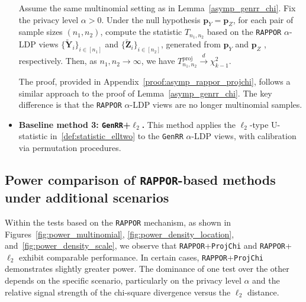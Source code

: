 \documentclass[twoside,11pt]{article}
\newcommand{\alphabetSize}{k} %
\newcommand{\sampleSize}{n}
\newcommand{\privacyParameter}{\alpha} %
\begin{document}
\begin{appendix}
\begin{itemize}
	\begin{lemma} \label{asymp_rappor_projchi} 
		Assume the same multinomial setting as in Lemma~\ref{asymp_genrr_chi}.
		Fix the privacy level $\privacyParameter>0$.
		Under the null hypothesis $\mathbf{p}_Y = \mathbf{p}_Z$, for each pair of sample sizes $(n_1, n_2)$, compute the statistic $T_{n_1, n_2}$ based on the  \textnormal{\texttt{RAPPOR}} $\privacyParameter$-LDP views $\{\tilde{\mathbf{Y}}_i\}_{i \in [n_1]}$ and $\{\tilde{\mathbf{Z}}_i\}_{i \in [n_2]}$, generated from $\mathbf{p}_Y$ and $\mathbf{p}_Z$ , respectively. Then, as $n_1, n_2 \to \infty$, we have $T^{\mathrm{proj}}_{\sampleSize_1, \sampleSize_2}
		\stackrel{d}{\to} \chi^2_{\alphabetSize-1}$.
	\end{lemma}
	The proof, provided in Appendix~\ref{proof:asymp_rappor_projchi}, follows a similar approach to the proof of Lemma~\ref{asymp_genrr_chi}. The key difference is that the \texttt{RAPPOR} $\privacyParameter$-LDP views are no longer multinomial samples.
	\item \textbf{Baseline method 3: \texttt{GenRR}+$\ell_2$.} This method applies the $\ell_2$-type U-statistic in~\eqref{def:statistic_elltwo} to the \texttt{GenRR} $\privacyParameter$-LDP views, with calibration via  permutation procedures.
	\end{itemize}
	\subsection{Power comparison of \texttt{RAPPOR}-based methods under additional scenarios }\label{appendix:powerlaw}
	Within the tests based on the \texttt{RAPPOR} mechanism, as shown in Figures~\ref{fig:power_multinomial}, \ref{fig:power_density_location}, and~\ref{fig:power_density_scale}, we observe that \texttt{RAPPOR}+\texttt{ProjChi} and \texttt{RAPPOR}+$\ell_2$ exhibit comparable performance. In certain cases, \texttt{RAPPOR}+\texttt{ProjChi} demonstrates slightly greater power. The dominance of one test over the other depends on the specific scenario, particularly on the privacy level $\privacyParameter$ and the relative signal strength of the chi-square divergence versus the $\ell_2$ distance. 
	

\end{appendix}
\end{document}
